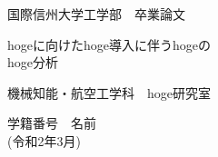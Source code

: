 \documentclass[a4paper,xelatex,ja=standard,hiresbb,12pt]{bxjsarticle}
\begin{document}
\begin{flushleft}
\large{国際信州大学工学部　卒業論文}
\end{flushleft}
\vspace{150pt}
\begin{center}
        
\LARGE{hogeに向けたhoge導入に伴うhogeの\\hoge分析}
\vspace{130pt}
        
\Large{機械知能・航空工学科　hoge研究室} 
\vspace{15pt}
        

\Large{学籍番号　名前} \\ 
\vspace{15pt}
\large{(令和2年3月)}
        
\thispagestyle{empty}	%
        
\end{center}
\newpage
\mbox{}
\thispagestyle{empty}
\newpage
\tableofcontents
\thispagestyle{empty}	%
\newpage
\mbox{}
\thispagestyle{empty}
\newpage


\clearpage

\clearpage

\clearpage

\clearpage

\clearpage

 
\newpage

\end{document}
